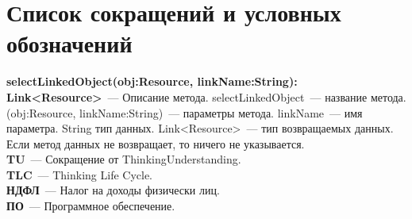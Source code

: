 \chapter*{Список сокращений и условных обозначений}             %

\textbf{selectLinkedObject(obj:Resource, linkName:String): Link<Resource>}~--- Описание метода. selectLinkedObject~--- название метода. (obj:Resource, linkName:String)~--- параметры метода. linkName~--- имя параметра. String тип данных. Link<Resource>~--- тип возвращаемых данных. Если метод данных не возвращает, то ничего не указывается.\\

\textbf{TU}~--- Сокращение от ThinkingUnderstanding.\\

\textbf{TLC}~--- Thinking Life Cycle.\\

\textbf{НДФЛ}~--- Налог на доходы физически лиц.\\

\textbf{ПО}~--- Программное обеспечение.\\

\clearpage

